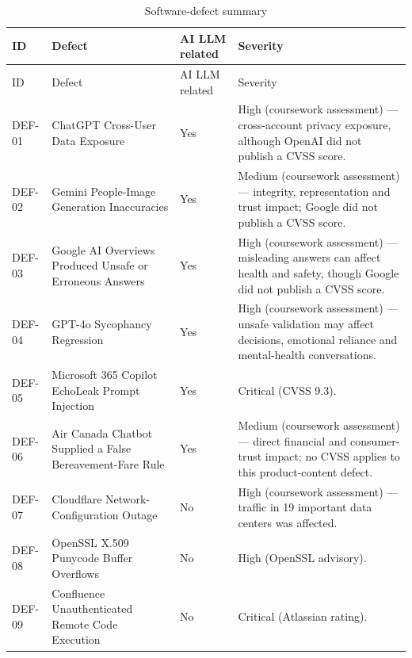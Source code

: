 \begin{longtable}{p{}p{}p{}p{}}

\caption{Software-defect summary}\\\toprule

ID & Defect & AI LLM related & Severity \\\midrule\endfirsthead

\toprule ID & Defect & AI LLM related & Severity \\\midrule\endhead

DEF-01 & ChatGPT Cross-User Data Exposure & Yes & High (coursework assessment) — cross-account privacy exposure, although OpenAI did not publish a CVSS score. \\

DEF-02 & Gemini People-Image Generation Inaccuracies & Yes & Medium (coursework assessment) — integrity, representation and trust impact; Google did not publish a CVSS score. \\

DEF-03 & Google AI Overviews Produced Unsafe or Erroneous Answers & Yes & High (coursework assessment) — misleading answers can affect health and safety, though Google did not publish a CVSS score. \\

DEF-04 & GPT-4o Sycophancy Regression & Yes & High (coursework assessment) — unsafe validation may affect decisions, emotional reliance and mental-health conversations. \\

DEF-05 & Microsoft 365 Copilot EchoLeak Prompt Injection & Yes & Critical (CVSS 9.3). \\

DEF-06 & Air Canada Chatbot Supplied a False Bereavement-Fare Rule & Yes & Medium (coursework assessment) — direct financial and consumer- trust impact; no CVSS applies to this product-content defect. \\

DEF-07 & Cloudflare Network-Configuration Outage & No & High (coursework assessment) — traffic in 19 important data centers was affected. \\

DEF-08 & OpenSSL X.509 Punycode Buffer Overflows & No & High (OpenSSL advisory). \\

DEF-09 & Confluence Unauthenticated Remote Code Execution & No & Critical (Atlassian rating). \\


\end{longtable}
